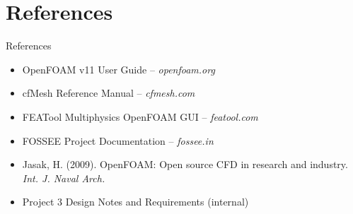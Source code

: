\documentclass[dvipsnames,mathserif]{beamer}
\begin{document}
\section{References}
\begin{frame}{References}
    \begin{itemize}
        \item OpenFOAM v11 User Guide -- \textit{openfoam.org}
        \item cfMesh Reference Manual -- \textit{cfmesh.com}
        \item FEATool Multiphysics OpenFOAM GUI -- \textit{featool.com}
        \item FOSSEE Project Documentation -- \textit{fossee.in}
        \item Jasak, H. (2009). OpenFOAM: Open source CFD in research and industry. \textit{Int. J. Naval Arch.}
        \item Project 3 Design Notes and Requirements (internal)
    \end{itemize}
\end{frame}
\end{document}
